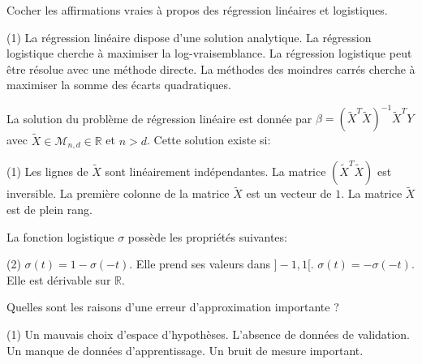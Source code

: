 \documentclass[solutions]{../cc}
\begin{document}
	\begin{question}
		Cocher les affirmations vraies à propos des régression linéaires et logistiques.
		\begin{tasks}(1)
			\task La régression linéaire dispose d'une solution analytique.
			\task La régression logistique cherche à maximiser la log-vraisemblance.
			\task La régression logistique peut être résolue avec une méthode directe.
			\task La méthodes des moindres carrés cherche à maximiser la somme des écarts quadratiques.
		\end{tasks}
	\end{question}
	
	\begin{question}
		La solution du problème de régression linéaire est donnée par $\hat{\beta} = (\tilde{X}^T \tilde{X})^{-1} \tilde{X}^T Y$ avec $\tilde{X} \in \mathcal{M}_{n,d} \in \mathbb{R}$ et $n > d$. Cette solution existe si:
		\begin{tasks}(1)
			\task Les lignes de $\tilde{X}$ sont linéairement indépendantes.
			\task La matrice $(\tilde{X}^T \tilde{X})$ est inversible.
			\task La première colonne de la matrice $\tilde{X}$ est un vecteur de $1$.
			\task La matrice $\tilde{X}$ est de plein rang.
		\end{tasks}
	\end{question}

	\begin{question}
		La fonction logistique $\sigma$ possède les propriétés suivantes:
		\begin{tasks}(2)
			\task $\sigma(t) = 1 - \sigma(-t)$.
			\task Elle prend ses valeurs dans $]-1, 1[$.
			\task $\sigma(t) = -\sigma(-t)$.
			\task Elle est dérivable sur $\mathbb{R}$.
		\end{tasks}
	\end{question}
	
	\begin{question}
		Quelles sont les raisons d'une erreur d'approximation importante ?
		\begin{tasks}(1)
			\task Un mauvais choix d'espace d'hypothèses.
			\task L'absence de données de validation.
			\task Un manque de données d'apprentissage.
			\task Un bruit de mesure important.
		\end{tasks}
	\end{question}
\end{document}
